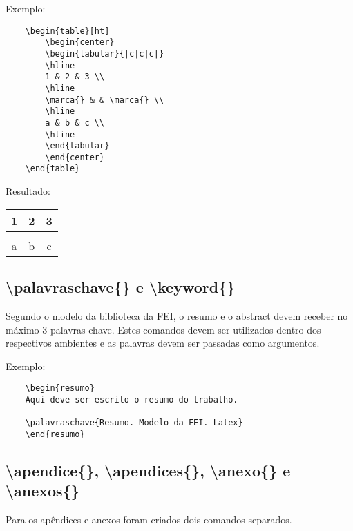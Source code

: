     Exemplo:
    \begin{verbatim}
    \begin{table}[ht]
        \begin{center}
        \begin{tabular}{|c|c|c|}
        \hline
        1 & 2 & 3 \\
        \hline
        \marca{} & & \marca{} \\
        \hline
        a & b & c \\
        \hline
        \end{tabular}
        \end{center}
    \end{table}
    \end{verbatim}
    Resultado: 
    \begin{table}[ht]
        \begin{center}
        \begin{tabular}{|c|c|c|}
        \hline
        1 & 2 & 3 \\
        \hline
        \marca{} & & \marca{} \\
        \hline
        a & b & c \\
        \hline
        \end{tabular}
        \end{center}
    \end{table}
    
    
    \subsection{\textbackslash palavraschave\{\} e \textbackslash keyword\{\}}
    Segundo o modelo da biblioteca da FEI, o resumo e o abstract devem receber no máximo 3 palavras chave. Estes comandos devem ser utilizados dentro dos respectivos ambientes e as palavras devem ser passadas como argumentos.

    Exemplo:
    \begin{verbatim}
    \begin{resumo}
    Aqui deve ser escrito o resumo do trabalho.

    \palavraschave{Resumo. Modelo da FEI. Latex}
    \end{resumo}
    \end{verbatim}
    
    \subsection{\textbackslash apendice\{\}, \textbackslash apendices\{\}, \textbackslash anexo\{\} e \textbackslash anexos\{\}}
    Para os apêndices e anexos foram criados dois comandos separados.

